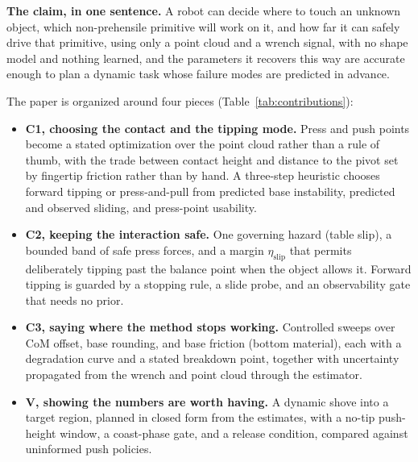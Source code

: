 \documentclass[10pt, conference]{IEEEtran}
\newcommand{\sh}[1]{\textcolor{orange}{SH: #1}}
\begin{document}

\noindent\textbf{The claim, in one sentence.} A robot can decide where to touch an unknown object, which non-prehensile primitive will work on it, and how far it can safely drive that primitive, using only a point cloud and a wrench signal, with no shape model and nothing learned, and the parameters it recovers this way are accurate enough to plan a dynamic task whose failure modes are predicted in advance.

The paper is organized around four pieces (Table~\ref{tab:contributions}):

\begin{itemize}
  \item \textbf{C1, choosing the contact and the tipping mode.} Press and push points become a stated optimization over the point cloud rather than a rule of thumb, with the trade between contact height and distance to the pivot set by fingertip friction rather than by hand. A three-step heuristic chooses forward tipping or press-and-pull from predicted base instability, predicted and observed sliding, and press-point usability.
  \item \textbf{C2, keeping the interaction safe.} One governing hazard (table slip), a bounded band of safe press forces, and a margin $\eta_{\mathrm{slip}}$ that permits deliberately tipping past the balance point when the object allows it. Forward tipping is guarded by a stopping rule, a slide probe, and an observability gate that needs no prior.
  \item \textbf{C3, saying where the method stops working.} Controlled sweeps over CoM offset, base rounding, and base friction (bottom material), each with a degradation curve and a stated breakdown point, together with uncertainty propagated from the wrench and point cloud through the estimator.
  \item \textbf{V, showing the numbers are worth having.} A dynamic shove into a target region, planned in closed form from the estimates, with a no-tip push-height window, a coast-phase gate, and a release condition, compared against uninformed push policies.
\end{itemize}
\end{document}
